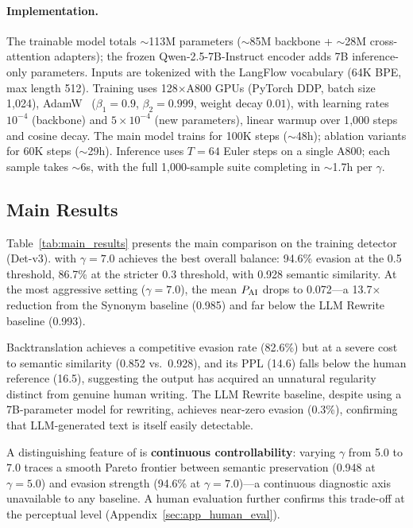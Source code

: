 \paragraph{Implementation.}
The trainable model totals ${\sim}$113M parameters (${\sim}$85M backbone + ${\sim}$28M cross-attention adapters); the frozen Qwen-2.5-7B-Instruct encoder adds 7B inference-only parameters.
Inputs are tokenized with the LangFlow vocabulary (64K BPE, max length 512).
Training uses 128$\times$A800 GPUs (PyTorch DDP, batch size 1{,}024), AdamW~\citep{loshchilov2019decoupled} ($\beta_1{=}0.9$, $\beta_2{=}0.999$, weight decay $0.01$), with learning rates $10^{-4}$ (backbone) and $5{\times}10^{-4}$ (new parameters), linear warmup over 1{,}000 steps and cosine decay.
The main model trains for 100K steps (${\sim}$48h); ablation variants for 60K steps (${\sim}$29h).
Inference uses $T{=}64$ Euler steps on a single A800; each sample takes ${\sim}$6s, with the full 1{,}000-sample suite completing in ${\sim}$1.7h per $\gamma$.

\subsection{Main Results}
\label{sec:main_results}

Table~\ref{tab:main_results} presents the main comparison on the training detector (Det-v3).
\styleshield{} with $\gamma{=}7.0$ achieves the best overall balance: 94.6\% evasion at the 0.5 threshold, 86.7\% at the stricter 0.3 threshold, with 0.928 semantic similarity.
At the most aggressive setting ($\gamma{=}7.0$), the mean $P_{\text{AI}}$ drops to 0.072---a 13.7$\times$ reduction from the Synonym baseline (0.985) and far below the LLM Rewrite baseline (0.993).

Backtranslation achieves a competitive evasion rate (82.6\%) but at a severe cost to semantic similarity (0.852 vs.\ 0.928), and its PPL (14.6) falls below the human reference (16.5), suggesting the output has acquired an unnatural regularity distinct from genuine human writing.
The LLM Rewrite baseline, despite using a 7B-parameter model for rewriting, achieves near-zero evasion (0.3\%), confirming that LLM-generated text is itself easily detectable.

A distinguishing feature of \styleshield{} is \textbf{continuous controllability}: varying $\gamma$ from 5.0 to 7.0 traces a smooth Pareto frontier between semantic preservation (0.948 at $\gamma{=}5.0$) and evasion strength (94.6\% at $\gamma{=}7.0$)---a continuous diagnostic axis unavailable to any baseline.
A human evaluation further confirms this trade-off at the perceptual level (Appendix~\ref{sec:app_human_eval}).

